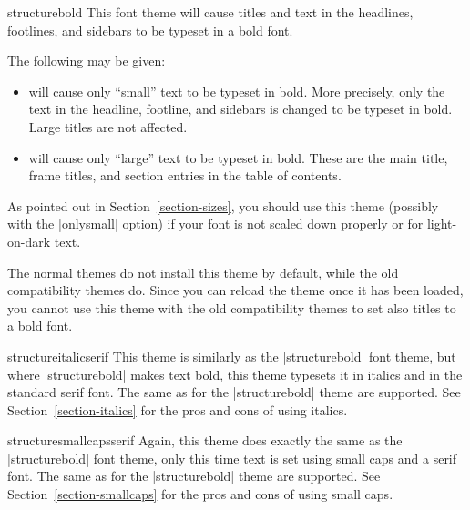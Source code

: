 \begin{fontthemeexample}{structurebold}
  This font theme will cause titles and text in the headlines,
  footlines, and sidebars to be typeset in a bold font.

  The following  may be given:
  \begin{itemize}
  \item
    will cause only ``small'' text to be typeset in bold. More
    precisely, only the text in the headline, footline, and sidebars
    is changed to be typeset in bold. Large titles are not affected.
  \item
    will cause only ``large'' text to be typeset in bold. These are
    the main title, frame titles, and section entries in the table of
    contents.     
  \end{itemize}

  As pointed out in Section~\ref{section-sizes}, you should use this
  theme (possibly with the |onlysmall| option) if your font is not
  scaled down properly or for light-on-dark text.

  The normal themes do not install this theme by default, while the
  old compatibility themes do. Since you can reload the theme once it
  has been loaded, you cannot use this theme with the old
  compatibility themes to set also titles to a bold font. 
\end{fontthemeexample}

\begin{fontthemeexample}{structureitalicserif}
  This theme is similarly as the |structurebold| font theme, but where
  |structurebold| makes text bold, this theme typesets it in italics and
  in the standard serif font. The same  as for the
  |structurebold| theme are supported. See
  Section~\ref{section-italics} for the pros and cons 
  of using italics.  
\end{fontthemeexample}

\begin{fontthemeexample}{structuresmallcapsserif}
  Again, this theme does exactly the same as the |structurebold| font theme,
  only this time text is set using small caps and a serif
    font. The same  as for the |structurebold| theme are
  supported. See Section~\ref{section-smallcaps} for the pros and cons
  of using small caps.  
\end{fontthemeexample}






